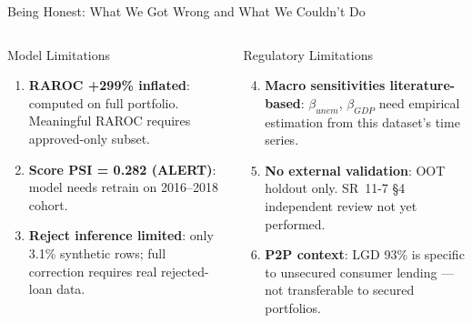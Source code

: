 \documentclass[aspectratio=169,11pt]{beamer}
\newcommand{\B}[1]{\textbf{#1}}
\begin{document}
\begin{frame}{Being Honest: What We Got Wrong and What We Couldn't Do}
  \begin{columns}[T]
      \begin{alertblock}{Model Limitations}\footnotesize
        \begin{enumerate}
          \item \B{RAROC +299\% inflated}: computed on full portfolio. Meaningful RAROC requires approved-only subset.
          \item \B{Score PSI = 0.282 (ALERT)}: model needs retrain on 2016--2018 cohort.
          \item \B{Reject inference limited}: only 3.1\% synthetic rows; full correction requires real rejected-loan data.
        \end{enumerate}
      \end{alertblock}

      \begin{alertblock}{Regulatory Limitations}\footnotesize
        \begin{enumerate}
          \setcounter{enumi}{3}
          \item \B{Macro sensitivities literature-based}: $\beta_{unem}$, $\beta_{GDP}$ need empirical estimation from this dataset's time series.
          \item \B{No external validation}: OOT holdout only. SR~11-7 \S4 independent review not yet performed.
          \item \B{P2P context}: LGD 93\% is specific to unsecured consumer lending --- not transferable to secured portfolios.
        \end{enumerate}
      \end{alertblock}
  \end{columns}
\end{frame}
\end{document}
